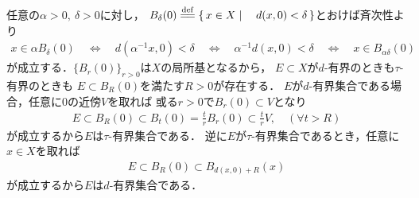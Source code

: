 	\begin{prf}
		任意の$\alpha>0,\ \delta>0$に対し，
		$B_{\delta}(0) \defeq \Set{x \in X}{d(x,0) < \delta}$とおけば斉次性より
		\begin{align}
			x \in \alpha B_{\delta}(0) 
			\quad \Longleftrightarrow \quad d\left( \alpha^{-1}x,0 \right) < \delta
			\quad \Longleftrightarrow \quad \alpha^{-1}d(x,0) < \delta
			\quad \Longleftrightarrow \quad x \in B_{\alpha\delta}(0)
		\end{align}
		が成立する．$\{B_r(0)\}_{r > 0}$は$X$の局所基となるから，
		$E \subset X$が$d$-有界のときも$\tau$-有界のときも
		$E \subset B_R(0)$を満たす$R > 0$が存在する．
		$E$が$d$-有界集合である場合，任意に0の近傍$V$を取れば
		或る$r > 0$で$B_r(0) \subset V$となり
		\begin{align}
			E \subset B_R(0) \subset B_t(0) = \frac{t}{r} B_r(0) \subset \frac{t}{r}V,
			\quad (\forall t > R)
		\end{align}
		が成立するから$E$は$\tau$-有界集合である．
		逆に$E$が$\tau$-有界集合であるとき，任意に$x \in X$を取れば
		\begin{align}
			E \subset B_R(0) \subset B_{d(x,0) + R}(x)
		\end{align}
		が成立するから$E$は$d$-有界集合である．
		\QED
	\end{prf}
	